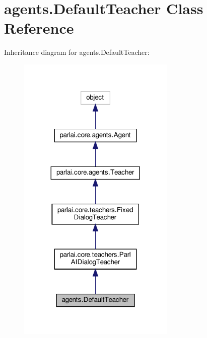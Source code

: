 \hypertarget{classagents_1_1DefaultTeacher}{}\section{agents.\+Default\+Teacher Class Reference}
\label{classagents_1_1DefaultTeacher}


Inheritance diagram for agents.\+Default\+Teacher\+:
\nopagebreak
\begin{figure}[H]
\begin{center}
\leavevmode
\includegraphics[width=212pt]{classagents_1_1DefaultTeacher__inherit__graph}
\end{center}
\end{figure}


